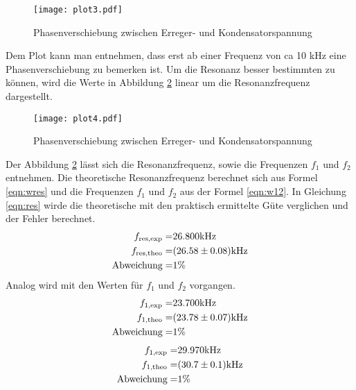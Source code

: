 \begin{figure}
  \centering
  \texttt{[image: plot3.pdf]}
  \caption{Phasenverschiebung zwischen Erreger- und Kondensatorspannung}
  \label{fig:logphi}
\end{figure}
Dem Plot kann man entnehmen, dass erst ab einer Frequenz von ca 10 kHz eine Phasenverschiebung zu bemerken ist. Um die Resonanz besser bestimmten zu können, wird die Werte in Abbildung \ref{fig:Phi} linear um die Resonanzfrequenz dargestellt. 
\begin{figure}
  \centering
  \texttt{[image: plot4.pdf]}
  \caption{Phasenverschiebung zwischen Erreger- und Kondensatorspannung}
  \label{fig:Phi}
\end{figure}
Der Abbildung \ref{fig:Phi} lässt sich die Resonanzfrequenz, sowie die Frequenzen $f_1$ und $f_2$ entnehmen. Die theoretische Resonanzfrequenz berechnet sich aus Formel \ref{eqn:wres} und die Frequenzen $f_1$ und $f_2$ aus der Formel \ref{eqn:w12}. In Gleichung \ref{eqn:res} wirde die theoretische mit den praktisch ermittelte Güte verglichen und der Fehler berechnet.
\begin{eqnarray}
  f_\text{res,exp} =& 26.800 \text{kHz}			\\
  f_\text{res,theo} =& (\num{26.58 +- 0.08}) \text{kHz} \\
  \text{Abweichung} =& 1 \% 
  \label{eqn:res}
\end{eqnarray}
Analog wird mit den Werten für $f_1$ und $f_2$ vorgangen.
\begin{eqnarray}
  f_\text{1,exp} =& 23.700 \text{kHz}                 \\
  f_\text{1,theo} =& (\num{23.78 +- 0.07}) \text{kHz} \\
  \text{Abweichung} =& 1 \% 
\end{eqnarray}
\begin{eqnarray}
  f_\text{1,exp} =& 29.970 \text{kHz}                 \\
  f_\text{1,theo} =& (\num{30.7 +- 0.1}) \text{kHz} \\
  \text{Abweichung} =& 1 \% 
\end{eqnarray}

